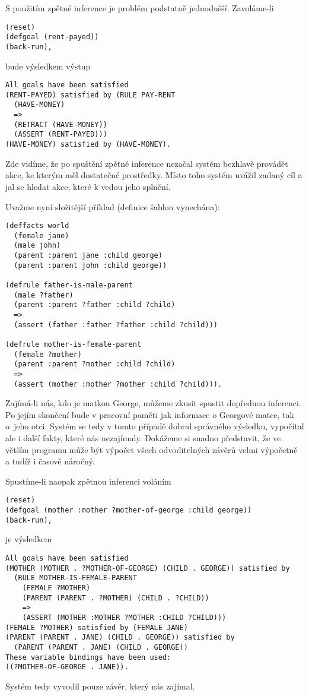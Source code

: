S použitím zpětné inference je problém podstatně jednodušší. Zavoláme-li
\begin{verbatim}
(reset)
(defgoal (rent-payed))
(back-run),
\end{verbatim}
bude výsledkem výstup
\begin{verbatim}
All goals have been satisfied
(RENT-PAYED) satisfied by (RULE PAY-RENT
  (HAVE-MONEY)
  =>
  (RETRACT (HAVE-MONEY))
  (ASSERT (RENT-PAYED)))
(HAVE-MONEY) satisfied by (HAVE-MONEY).
\end{verbatim}
Zde vidíme, že po spuštění zpětné inference nezačal systém bezhlavě provádět
akce, ke kterým měl dostatečné prostředky. Místo toho systém uvážil zadaný cíl a
jal se hledat akce, které k vedou jeho splnění.

Uvažme nyní složitější příklad (definice šablon vynechána):
\begin{verbatim}
(deffacts world
  (female jane)
  (male john)
  (parent :parent jane :child george)
  (parent :parent john :child george))

(defrule father-is-male-parent
  (male ?father)
  (parent :parent ?father :child ?child)
  =>
  (assert (father :father ?father :child ?child)))

(defrule mother-is-female-parent
  (female ?mother)
  (parent :parent ?mother :child ?child)
  =>
  (assert (mother :mother ?mother :child ?child))).
\end{verbatim}
Zajímá-li nás, kdo je matkou George, můžeme zkusit spustit dopřednou inferenci.
Po jejím skončení bude v pracovní paměti jak informace o Georgově matce, tak
o~jeho otci. Systém se tedy v tomto případě dobral správného výsledku, vypočítal
ale i další fakty, které nás nezajímaly. Dokážeme si snadno představit, že ve
větším programu může být výpočet všech odvoditelných závěrů velmi výpočetně
a tudíž i časově náročný.

Spustíme-li naopak zpětnou inferenci voláním
\begin{verbatim}
(reset)
(defgoal (mother :mother ?mother-of-george :child george))
(back-run),
\end{verbatim}
je výsledkem
\begin{verbatim}
All goals have been satisfied
(MOTHER (MOTHER . ?MOTHER-OF-GEORGE) (CHILD . GEORGE)) satisfied by
  (RULE MOTHER-IS-FEMALE-PARENT
    (FEMALE ?MOTHER)
    (PARENT (PARENT . ?MOTHER) (CHILD . ?CHILD))
    =>
    (ASSERT (MOTHER :MOTHER ?MOTHER :CHILD ?CHILD)))
(FEMALE ?MOTHER) satisfied by (FEMALE JANE)
(PARENT (PARENT . JANE) (CHILD . GEORGE)) satisfied by
  (PARENT (PARENT . JANE) (CHILD . GEORGE))
These variable bindings have been used:
((?MOTHER-OF-GEORGE . JANE)).
\end{verbatim}
Systém tedy vyvodil pouze závěr, který nás zajímal.

